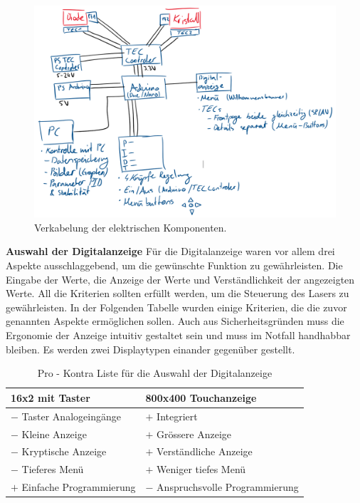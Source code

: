 \begin{figure}[H]
    \centering
    \includegraphics[scale=0.5]{98_images/scheme_wiring.PNG}
    \caption{Verkabelung der elektrischen Komponenten.}
    \label{fig:scheme_wiring_hw}
\end{figure}

\textbf{Auswahl der Digitalanzeige}
Für die Digitalanzeige waren vor allem drei Aspekte ausschlaggebend, um die gewünschte Funktion zu gewährleisten. Die Eingabe der Werte, die Anzeige der Werte und Verständlichkeit der angezeigten Werte. All die Kriterien sollten erfüllt werden, um die Steuerung des Lasers zu gewährleisten. In der Folgenden Tabelle wurden einige Kriterien, die die zuvor genannten Aspekte ermöglichen sollen. Auch aus Sicherheitsgründen muss die Ergonomie der Anzeige intuitiv gestaltet sein und muss im Notfall handhabbar bleiben. Es werden zwei Displaytypen einander gegenüber gestellt.

\begin{table}[H]
    \centering
    \begin{tabular}{l|l}
        \textbf{16x2 mit Taster}&       \textbf{800x400 Touchanzeige}\\
        \hline
        $-$ Taster Analogeingänge&      $+$ Integriert\\
        $-$ Kleine Anzeige&             $+$ Grössere Anzeige\\
        $-$ Kryptische Anzeige&         $+$ Verständliche Anzeige\\
        $-$ Tieferes Menü&              $+$ Weniger tiefes Menü\\
        $+$ Einfache Programmierung&    $-$ Anspruchsvolle Programmierung\\
    \end{tabular}
    \caption{Pro - Kontra Liste für die Auswahl der Digitalanzeige}
    \label{tab:choice_display_hw}
\end{table}

